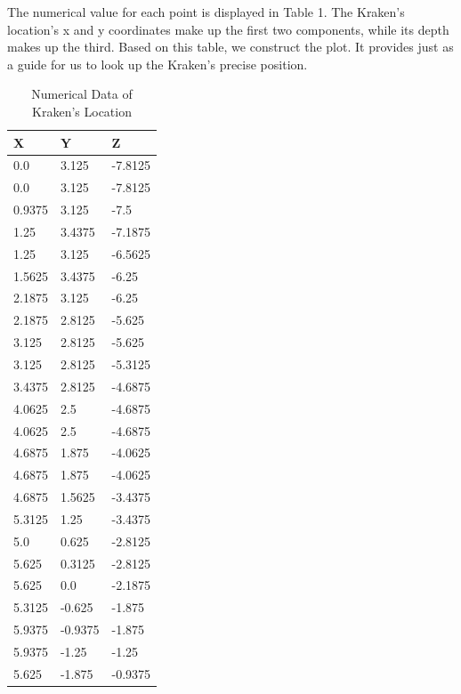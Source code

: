 \documentclass[12pt]{article}%
\begin{document}
The numerical value for each point is displayed in Table 1. The Kraken's location's x and y coordinates make up the first two components, while its depth makes up the third. Based on this table, we construct the plot. It provides just as a guide for us to look up the Kraken's precise position.
\begin{table}[H]
    \centering
    \caption{Numerical Data of Kraken's Location}
    \begin{tabular}{|l|l|l|}
        \hline
            X & Y & Z \\ \hline
            0.0 & 3.125 & -7.8125 \\ \hline
            0.0 & 3.125 & -7.8125 \\ \hline
            0.9375 & 3.125 & -7.5 \\ \hline
            1.25 & 3.4375 & -7.1875 \\ \hline
            1.25 & 3.125 & -6.5625 \\ \hline
            1.5625 & 3.4375 & -6.25 \\ \hline
            2.1875 & 3.125 & -6.25 \\ \hline
            2.1875 & 2.8125 & -5.625 \\ \hline
            3.125 & 2.8125 & -5.625 \\ \hline
            3.125 & 2.8125 & -5.3125 \\ \hline
            3.4375 & 2.8125 & -4.6875 \\ \hline
            4.0625 & 2.5 & -4.6875 \\ \hline
            4.0625 & 2.5 & -4.6875 \\ \hline
            4.6875 & 1.875 & -4.0625 \\ \hline
            4.6875 & 1.875 & -4.0625 \\ \hline
            4.6875 & 1.5625 & -3.4375 \\ \hline
            5.3125 & 1.25 & -3.4375 \\ \hline
            5.0 & 0.625 & -2.8125 \\ \hline
            5.625 & 0.3125 & -2.8125 \\ \hline
            5.625 & 0.0 & -2.1875 \\ \hline
            5.3125 & -0.625 & -1.875 \\ \hline
            5.9375 & -0.9375 & -1.875 \\ \hline
            5.9375 & -1.25 & -1.25 \\ \hline
            5.625 & -1.875 & -0.9375 \\ \hline

\end{tabular}
\end{table}
\end{document}
